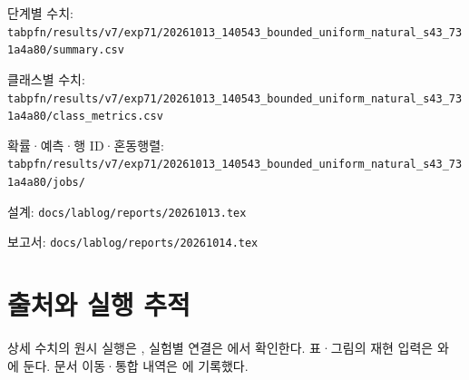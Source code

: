 \par\noindent \textbullet\enspace 단계별 수치: \texttt{tabpfn/\allowbreak{}\allowbreak{}r\allowbreak{}esults/\allowbreak{}\allowbreak{}v\allowbreak{}7/\allowbreak{}\allowbreak{}exp71/\allowbreak{}\allowbreak{}20261013\allowbreak{}\_\allowbreak{}\allowbreak{}140543\_\allowbreak{}\allowbreak{}bounded\_\allowbreak{}\allowbreak{}uniform\_\allowbreak{}\allowbreak{}natural\_\allowbreak{}\allowbreak{}s43\_\allowbreak{}\allowbreak{}731a\allowbreak{}4a80/\allowbreak{}\allowbreak{}sum\allowbreak{}mary.\allowbreak{}csv\allowbreak{}}


\par\noindent \textbullet\enspace 클래스별 수치: \texttt{tabpfn/\allowbreak{}\allowbreak{}r\allowbreak{}esults/\allowbreak{}\allowbreak{}v\allowbreak{}7/\allowbreak{}\allowbreak{}exp71/\allowbreak{}\allowbreak{}20261013\allowbreak{}\_\allowbreak{}\allowbreak{}140543\_\allowbreak{}\allowbreak{}bounded\_\allowbreak{}\allowbreak{}uniform\_\allowbreak{}\allowbreak{}natural\_\allowbreak{}\allowbreak{}s43\_\allowbreak{}\allowbreak{}731a\allowbreak{}4a80/\allowbreak{}\allowbreak{}cla\allowbreak{}ss\_\allowbreak{}\allowbreak{}metri\allowbreak{}cs.\allowbreak{}csv}


\par\noindent \textbullet\enspace 확률·예측·행 ID·혼동행렬: \texttt{tabpfn/\allowbreak{}\allowbreak{}r\allowbreak{}esults/\allowbreak{}\allowbreak{}v\allowbreak{}7/\allowbreak{}\allowbreak{}exp71/\allowbreak{}\allowbreak{}20261013\allowbreak{}\_\allowbreak{}\allowbreak{}140543\_\allowbreak{}\allowbreak{}bounded\_\allowbreak{}\allowbreak{}uniform\_\allowbreak{}\allowbreak{}natural\_\allowbreak{}\allowbreak{}s43\_\allowbreak{}\allowbreak{}731a\allowbreak{}4a80/\allowbreak{}\allowbreak{}job\allowbreak{}s/\allowbreak{}\allowbreak{}}


\par\noindent \textbullet\enspace 설계: \texttt{docs/\allowbreak{}\allowbreak{}lab\allowbreak{}log/\allowbreak{}\allowbreak{}repo\allowbreak{}rts/\allowbreak{}\allowbreak{}2026\allowbreak{}1013.\allowbreak{}tex\allowbreak{}}


\par\noindent \textbullet\enspace 보고서: \texttt{docs/\allowbreak{}\allowbreak{}lab\allowbreak{}log/\allowbreak{}\allowbreak{}repo\allowbreak{}rts/\allowbreak{}\allowbreak{}2026\allowbreak{}1014.\allowbreak{}tex\allowbreak{}}




\section*{출처와 실행 추적}

상세 수치의 원시 실행은 , 실험별 연결은 에서 확인한다. 표·그림의 재현 입력은 와 에 둔다. 문서 이동·통합 내역은 에 기록했다.



